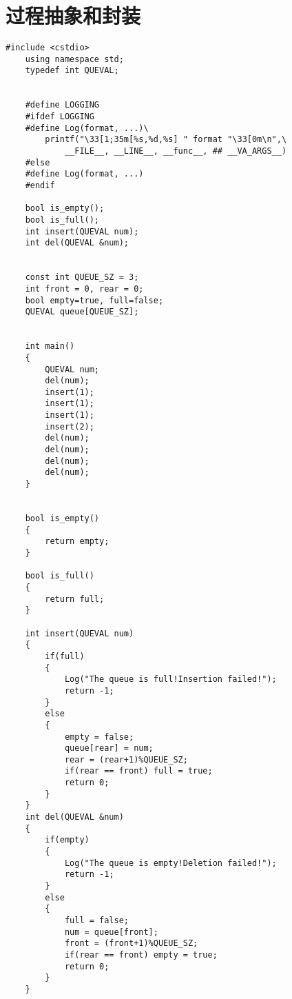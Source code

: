 \documentclass[UTF8]{ctexart}
\begin{document}
\section{过程抽象和封装}
\begin{lstlisting}[language={[ANSI]C++}]
    #include <cstdio>
    using namespace std;
    typedef int QUEVAL;
    
    
    #define LOGGING
    #ifdef LOGGING
    #define Log(format, ...)\
        printf("\33[1;35m[%s,%d,%s] " format "\33[0m\n",\
            __FILE__, __LINE__, __func__, ## __VA_ARGS__)
    #else
    #define Log(format, ...)  
    #endif
    
    bool is_empty();
    bool is_full();
    int insert(QUEVAL num);
    int del(QUEVAL &num);
    
    
    const int QUEUE_SZ = 3;
    int front = 0, rear = 0;
    bool empty=true, full=false;
    QUEVAL queue[QUEUE_SZ];
    
    
    int main()
    {
        QUEVAL num;
        del(num);
        insert(1);
        insert(1);
        insert(1);
        insert(2);
        del(num);
        del(num);
        del(num);
        del(num);
    }
    
    
    bool is_empty()
    {
        return empty;
    }
    
    bool is_full()
    {
        return full;
    }
            
    int insert(QUEVAL num)
    {
        if(full)
        {
            Log("The queue is full!Insertion failed!");
            return -1;
        }
        else
        {
            empty = false;
            queue[rear] = num;
            rear = (rear+1)%QUEUE_SZ;
            if(rear == front) full = true;
            return 0;
        }
    }
    int del(QUEVAL &num)
    {
        if(empty)
        {
            Log("The queue is empty!Deletion failed!");
            return -1;
        }
        else
        {
            full = false;
            num = queue[front];
            front = (front+1)%QUEUE_SZ;
            if(rear == front) empty = true;
            return 0;
        }
    }
\end{lstlisting}


\end{document}
